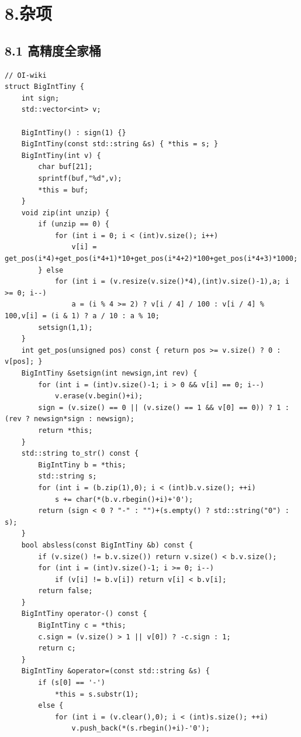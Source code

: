 \documentclass[UTF8,a4paper,11pt]{ctexart}
\begin{document}
\section*{8.杂项}

\subsection*{8.1 高精度全家桶}

\begin{Verbatim}[fontsize=\small,frame=single,breaklines=true,breakanywhere=true]
// OI-wiki
struct BigIntTiny {
    int sign;
    std::vector<int> v;

    BigIntTiny() : sign(1) {}
    BigIntTiny(const std::string &s) { *this = s; }
    BigIntTiny(int v) {
        char buf[21];
        sprintf(buf,"%d",v);
        *this = buf;
    }
    void zip(int unzip) {
        if (unzip == 0) {
            for (int i = 0; i < (int)v.size(); i++)
                v[i] = get_pos(i*4)+get_pos(i*4+1)*10+get_pos(i*4+2)*100+get_pos(i*4+3)*1000;
        } else
            for (int i = (v.resize(v.size()*4),(int)v.size()-1),a; i >= 0; i--)
                a = (i % 4 >= 2) ? v[i / 4] / 100 : v[i / 4] % 100,v[i] = (i & 1) ? a / 10 : a % 10;
        setsign(1,1);
    }
    int get_pos(unsigned pos) const { return pos >= v.size() ? 0 : v[pos]; }
    BigIntTiny &setsign(int newsign,int rev) {
        for (int i = (int)v.size()-1; i > 0 && v[i] == 0; i--)
            v.erase(v.begin()+i);
        sign = (v.size() == 0 || (v.size() == 1 && v[0] == 0)) ? 1 : (rev ? newsign*sign : newsign);
        return *this;
    }
    std::string to_str() const {
        BigIntTiny b = *this;
        std::string s;
        for (int i = (b.zip(1),0); i < (int)b.v.size(); ++i)
            s += char(*(b.v.rbegin()+i)+'0');
        return (sign < 0 ? "-" : "")+(s.empty() ? std::string("0") : s);
    }
    bool absless(const BigIntTiny &b) const {
        if (v.size() != b.v.size()) return v.size() < b.v.size();
        for (int i = (int)v.size()-1; i >= 0; i--)
            if (v[i] != b.v[i]) return v[i] < b.v[i];
        return false;
    }
    BigIntTiny operator-() const {
        BigIntTiny c = *this;
        c.sign = (v.size() > 1 || v[0]) ? -c.sign : 1;
        return c;
    }
    BigIntTiny &operator=(const std::string &s) {
        if (s[0] == '-')
            *this = s.substr(1);
        else {
            for (int i = (v.clear(),0); i < (int)s.size(); ++i)
                v.push_back(*(s.rbegin()+i)-'0');

\end{Verbatim}
\end{document}
